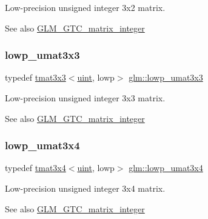 Low-\/precision unsigned integer 3x2 matrix. \begin{DoxySeeAlso}{See also}
\hyperlink{group__gtc__matrix__integer}{G\+L\+M\+\_\+\+G\+T\+C\+\_\+matrix\+\_\+integer} 
\end{DoxySeeAlso}
\mbox{\label{group__gtc__matrix__integer_gab27a50de8b11ec09b2f5cf1cf4c1a062}} 
\subsubsection{\texorpdfstring{lowp\+\_\+umat3x3}{lowp\_umat3x3}}
{\footnotesize\ttfamily typedef \hyperlink{structglm_1_1tmat3x3}{tmat3x3}$<$\hyperlink{group__core__precision_ga4fd29415871152bfb5abd588334147c8}{uint}, lowp$>$ \hyperlink{group__gtc__matrix__integer_gab27a50de8b11ec09b2f5cf1cf4c1a062}{glm\+::lowp\+\_\+umat3x3}}

Low-\/precision unsigned integer 3x3 matrix. \begin{DoxySeeAlso}{See also}
\hyperlink{group__gtc__matrix__integer}{G\+L\+M\+\_\+\+G\+T\+C\+\_\+matrix\+\_\+integer} 
\end{DoxySeeAlso}
\mbox{\label{group__gtc__matrix__integer_ga2ed807c71afb8c0f8742bb03e9f71829}} 
\subsubsection{\texorpdfstring{lowp\+\_\+umat3x4}{lowp\_umat3x4}}
{\footnotesize\ttfamily typedef \hyperlink{structglm_1_1tmat3x4}{tmat3x4}$<$\hyperlink{group__core__precision_ga4fd29415871152bfb5abd588334147c8}{uint}, lowp$>$ \hyperlink{group__gtc__matrix__integer_ga2ed807c71afb8c0f8742bb03e9f71829}{glm\+::lowp\+\_\+umat3x4}}

Low-\/precision unsigned integer 3x4 matrix. \begin{DoxySeeAlso}{See also}
\hyperlink{group__gtc__matrix__integer}{G\+L\+M\+\_\+\+G\+T\+C\+\_\+matrix\+\_\+integer} 
\end{DoxySeeAlso}
\mbox{\label{group__gtc__matrix__integer_gaa430d894a3290d551061d0d77c017cec}} 
